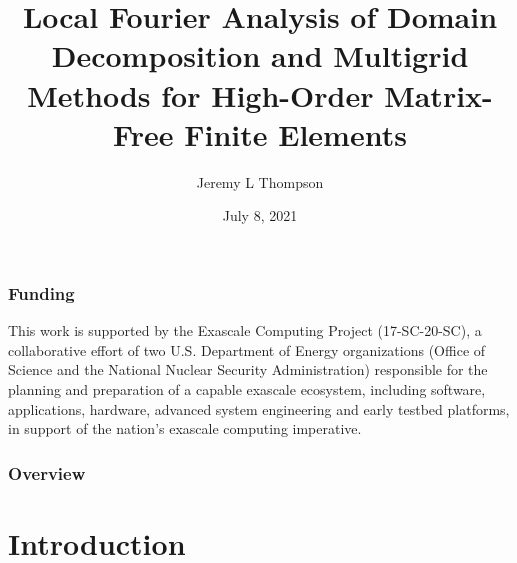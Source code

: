 \documentclass{beamer}
\title[LFA of High-Order Matrix-Free FEM]{Local Fourier Analysis of Domain Decomposition and Multigrid Methods for High-Order Matrix-Free Finite Elements} %
\author{Jeremy L Thompson} %
\institute[CU Boulder] %
{University of Colorado Boulder \\ %
\medskip
\textit{jeremy@jeremylt.org} %
}
\date{July 8, 2021} %
\begin{document}
\begin{frame}
\titlepage %
\end{frame}


\begin{frame}
\begin{center}
\frametitle{Funding}

This work is supported by the Exascale Computing Project (17-SC-20-SC), a collaborative effort of two U.S. Department of Energy organizations (Office of Science and the National Nuclear Security Administration) responsible for the planning and preparation of a capable exascale ecosystem, including software, applications, hardware, advanced system engineering and early testbed platforms, in support of the nation’s exascale computing imperative.

\end{center}
\end{frame}
 

\begin{frame}
\frametitle{Overview} %
\tableofcontents %
\end{frame}


\section{Introduction}
\end{document}
